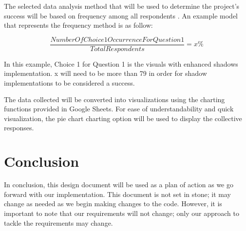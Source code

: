 \documentclass[10pt,journal,compsoc,draftclsnofoot]{IEEEtran}
\begin{document}
\begin{flushleft}
The selected data analysis method that will be used to determine the project's success will be based on frequency among all respondents \cite{SManalysis}. 
An example model that represents the frequency method is as follow:

\begin{equation}
\frac{Number Of Choice 1 Occurrence For Question 1}{Total Respondents} = x\%
\end{equation}

\vspace{3mm}
In this example, Choice 1 for Question 1 is the visuals with enhanced shadows implementation. 
x will need to be more than 79 in order for shadow implementations to be considered a success.

The data collected will be converted into visualizations using the charting functions provided in Google Sheets. 
For ease of understandability and quick visualization, the pie chart charting option will be used to display the collective responses. 

\newpage

\section{Conclusion}
In conclusion, this design document will be used as a plan of action as we go forward with our implementation.
This document is not set in stone; it may change as needed as we begin making changes to the code.
However, it is important to note that our requirements will not change; only our approach to tackle the requirements may change.

\end{flushleft}
\end{document}
